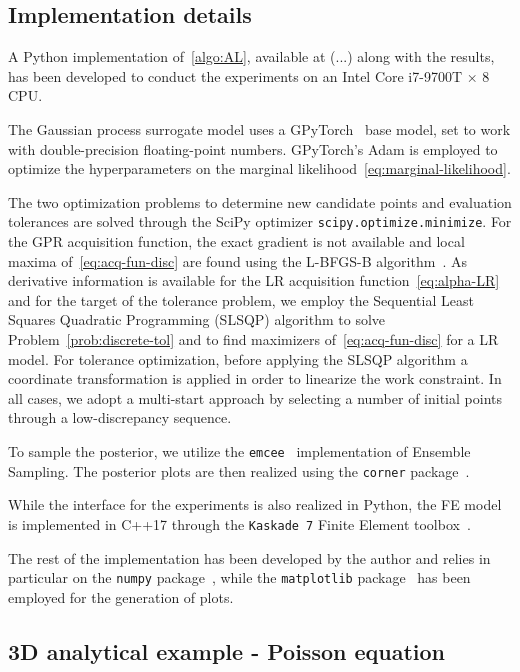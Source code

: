\subsection{Implementation details}\label{sec:implementation}
A Python implementation of~\ref{algo:AL}, available at (...) along with the results, has been developed to conduct the experiments on an Intel Core i7-9700T × 8 CPU. \medskip

The Gaussian process surrogate model uses a GPyTorch~\cite{GPyTorchPaper} base model, set to work with double-precision floating-point numbers.
GPyTorch's Adam is employed to optimize the hyperparameters on the marginal likelihood~\eqref{eq:marginal-likelihood}. \medskip

The two optimization problems to determine new candidate points and evaluation tolerances are solved through the SciPy optimizer \texttt{scipy.optimize.minimize}. 
For the GPR acquisition function, the exact gradient is not available and local maxima of~\eqref{eq:acq-fun-disc} are found using the L-BFGS-B algorithm~\cite{ZhuBirdNocedal}. 
As derivative information is available for the LR acquisition function~\eqref{eq:alpha-LR} and for the target of the tolerance problem, we employ the Sequential Least Squares Quadratic Programming (SLSQP) algorithm to solve Problem~\eqref{prob:discrete-tol} and to find maximizers of~\eqref{eq:acq-fun-disc} for a LR model. 
For tolerance optimization, before applying the SLSQP algorithm a coordinate transformation is applied in order to linearize the work constraint. 
In all cases, we adopt a multi-start approach by selecting a number of initial points through a low-discrepancy sequence. \medskip

To sample the posterior, we utilize the \texttt{emcee}~\cite{emceePaper} implementation of Ensemble Sampling. The posterior plots are then realized using the \texttt{corner} package~\cite{corner}. \medskip

While the interface for the experiments is also realized in Python, the FE model is implemented in C++17 through the \texttt{Kaskade 7} Finite Element toolbox~\cite{GoetschelSchielaWeiser2021}.\medskip

The rest of the implementation has been developed by the author and relies in particular on the \texttt{numpy} package~\cite{numpy}, while the \texttt{matplotlib} package~\cite{matplotlib} has been employed for the generation of plots. 

\subsection{3D analytical example - Poisson equation}\label{sec:3dexp}


